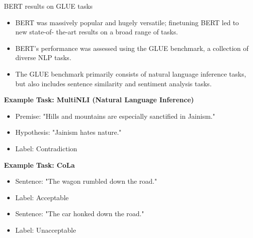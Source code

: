 \documentclass[handout]{beamer}
\begin{document}
\begin{frame}{BERT results on GLUE tasks}
\begin{scriptsize}
\begin{itemize}
 \item BERT was massively popular and hugely versatile; finetuning BERT led to new state-of-
the-art results on a broad range of tasks.
\item BERT's performance was assessed using the GLUE benchmark, a collection of diverse NLP tasks.
\item The GLUE benchmark primarily consists of natural language inference tasks, but also includes sentence similarity and sentiment analysis tasks.
\end{itemize}

\textbf{Example Task: MultiNLI (Natural Language Inference)}
\begin{itemize}
\item Premise: "Hills and mountains are especially sanctified in Jainism."
\item Hypothesis: "Jainism hates nature."
\item Label: Contradiction
\end{itemize}

\textbf{Example Task: CoLa}
\begin{itemize}
\item Sentence: "The wagon rumbled down the road."
\item Label: Acceptable
\end{itemize}
\begin{itemize}
\item Sentence: "The car honked down the road."
\item Label: Unacceptable
\end{itemize}


\end{scriptsize}
\end{frame}
\end{document}
